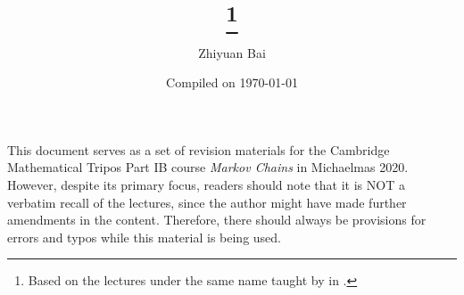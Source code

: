 \documentclass[a4paper]{article}
\title{\triposcourse{}
\thanks{Based on the lectures under the same name taught by \triposlecturer{} in \triposterm{}.}}
\author{Zhiyuan Bai}
\date{Compiled on \today}
\newcommand{\triposcourse}{Markov Chains}
\newcommand{\triposterm}{Michaelmas 2020}
\newcommand{\tripospart}{IB}
\theoremstyle{plain}
\theoremstyle{definition}
\theoremstyle{remark}
\begin{document}
    \maketitle
    This document serves as a set of revision materials for the Cambridge Mathematical Tripos Part \tripospart{} course \textit{\triposcourse{}} in \triposterm{}.
    However, despite its primary focus, readers should note that it is NOT a verbatim recall of the lectures, since the author might have made further amendments in the content.
    Therefore, there should always be provisions for errors and typos while this material is being used.
    \tableofcontents
    
    
    
    
    
    
    
    
    
    
    
    
\end{document}
